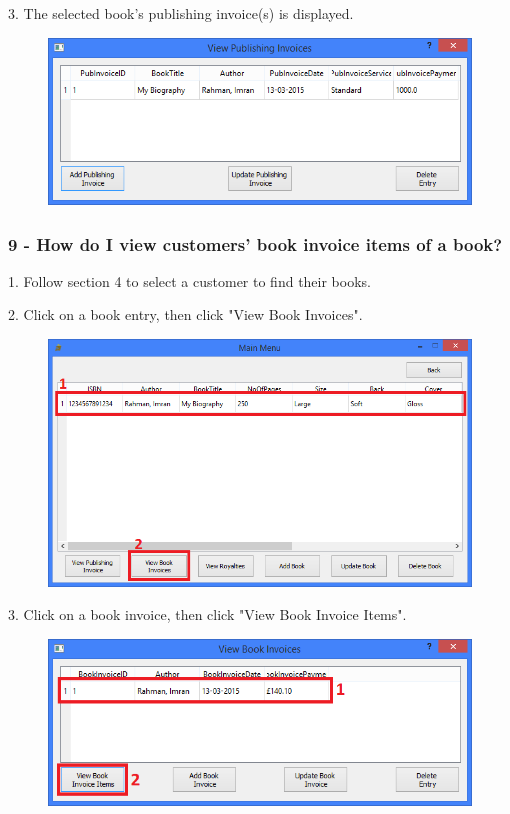 3. The selected book's publishing invoice(s) is displayed.

\begin{figure}[H]
    \includegraphics[width=\textwidth]{./Manual/Tutorial/Q8/PubInvoices.png}
\end{figure}

\subsubsection{9 -  How do I view customers' book invoice items of a book?}

1. Follow section 4 to select a customer to find their books.

2. Click on a book entry, then click "View Book Invoices".

\begin{figure}[H]
    \includegraphics[width=\textwidth]{./Manual/Tutorial/Q9/ViewBookInvoices.png}
\end{figure}

3. Click on a book invoice, then click "View Book Invoice Items".

\begin{figure}[H]
    \includegraphics[width=\textwidth]{./Manual/Tutorial/Q9/ViewBookInvoiceItems.png}
\end{figure}

